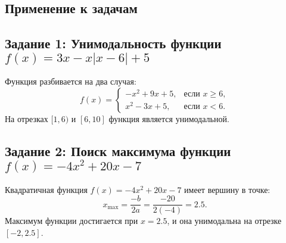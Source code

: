 \documentclass[a4paper,12pt]{article}
\begin{document}
\subsection*{Применение к задачам}

\subsection*{Задание 1: Унимодальность функции \( f(x) = 3x - x|x - 6| + 5 \)}
Функция разбивается на два случая:
\[
f(x) = 
\begin{cases} 
-x^2 + 9x + 5, & \text{если } x \geq 6, \\
x^2 - 3x + 5, & \text{если } x < 6.
\end{cases}
\]
На отрезках \( [1, 6) \) и \( [6, 10] \) функция является унимодальной.

\subsection*{Задание 2: Поиск максимума функции \( f(x) = -4x^2 + 20x - 7 \)}
Квадратичная функция \( f(x) = -4x^2 + 20x - 7 \) имеет вершину в точке:
\[
x_{\text{max}} = \frac{-b}{2a} = \frac{-20}{2(-4)} = 2.5.
\]
Максимум функции достигается при \( x = 2.5 \), и она унимодальна на отрезке \( [-2, 2.5] \).
\end{document}
